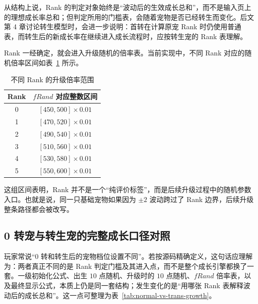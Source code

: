 从结构上说，Rank 的判定对象始终是“波动后的生效成长总和”，而不是输入页上的理想成长率总和；但判定所用的门槛表，会随着宠物是否已经转生而变化。后文第 4 章讨论转生模型时，会进一步说明：首转在计算原宠 Rank 时仍使用普通表，而转生后的新成长率在继续进入成长流程时，应按转生宠的 Rank 表理解。

Rank 一经确定，就会进入升级随机的倍率表。当前实现中，不同 Rank 对应的随机倍率区间如表~\ref{tab:frand-ranges} 所示。

\begin{table}[H]
    \centering
    \caption{不同 Rank 的升级倍率范围}
    \label{tab:frand-ranges}
    \begin{tabular}{cc}
        \toprule
        Rank & $fRand$ 对应整数区间 \\
        \midrule
        0 & $[450,500] \times 0.01$ \\
        1 & $[470,520] \times 0.01$ \\
        2 & $[490,540] \times 0.01$ \\
        3 & $[510,560] \times 0.01$ \\
        4 & $[530,580] \times 0.01$ \\
        5 & $[550,600] \times 0.01$ \\
        \bottomrule
    \end{tabular}
\end{table}

这组区间表明，Rank 并不是一个“纯评价标签”，而是后续升级过程中的随机参数入口。也就是说，同一只基础宠物如果因为 $\pm2$ 波动跨过了 Rank 边界，后续升级整条路径都会被改写。

\subsection{0 转宠与转生宠的完整成长口径对照}

玩家常说“0 转和转生后的宠物档位设置不同”。若按源码精确定义，这句话应理解为：两者真正不同的是 Rank 判定门槛及其进入点，而不是整个成长引擎都换了一套。一级初始化公式、出生 $10$ 点随机、升级时的 $10$ 点随机、$fRand$ 倍率表，以及最终显示公式，本质上仍是同一套结构；发生变化的是“用哪张 Rank 表解释波动后的成长总和”。这一点可整理为表~\ref{tab:normal-vs-trans-growth}。

